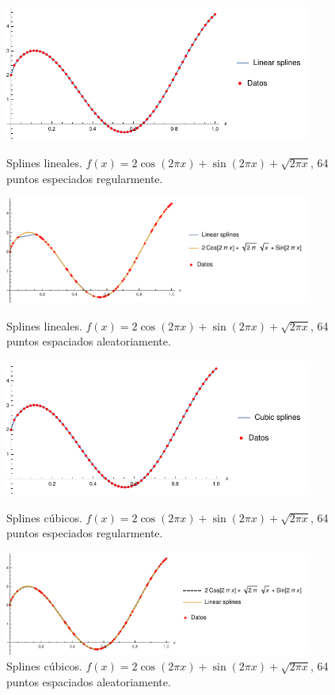 \documentclass[11pt,letterpaper]{article}
\begin{document}
\begin{figure}
\centering
\includegraphics[width=10cm]{img/33.pdf}
\caption{Splines lineales. $f(x)=2\cos (2\pi x)+\sin (2\pi x)+\sqrt{2\pi x}$, 64 puntos especiados regularmente.}
\includegraphics[width=10cm]{img/34.pdf}
\caption{Splines lineales. $f(x)=2\cos (2\pi x)+\sin (2\pi x)+\sqrt{2\pi x}$, 64 puntos espaciados aleatoriamente.}
\includegraphics[width=10cm]{img/35.pdf}
\caption{Splines cúbicos. $f(x)=2\cos (2\pi x)+\sin (2\pi x)+\sqrt{2\pi x}$, 64 puntos especiados regularmente.}
\includegraphics[width=10cm]{img/36.pdf}
\caption{Splines cúbicos. $f(x)=2\cos (2\pi x)+\sin (2\pi x)+\sqrt{2\pi x}$, 64 puntos espaciados aleatoriamente.}
\label{fig36}
\end{figure}
\end{document}
